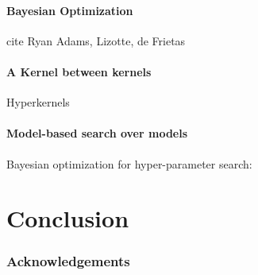 \documentclass[twoside]{article}
\begin{document}
\paragraph{Bayesian Optimization}

cite Ryan Adams, Lizotte, de Frietas

\paragraph{A Kernel between kernels}

Hyperkernels \cite{ong2002hyperkernels}

\paragraph{Model-based search over models}

Bayesian optimization for hyper-parameter search: \cite{snoek2012practical}

\section{Conclusion}

\subsubsection*{Acknowledgements}



\end{document}
